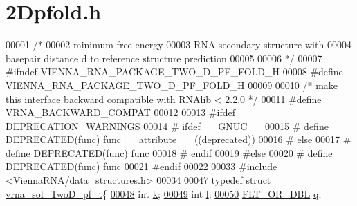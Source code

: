 \hypertarget{2Dpfold_8h_source}{}\section{2\+Dpfold.h}
\label{2Dpfold_8h_source}

\begin{DoxyCode}
00001 \textcolor{comment}{/*}
00002 \textcolor{comment}{      minimum free energy}
00003 \textcolor{comment}{      RNA secondary structure with}
00004 \textcolor{comment}{      basepair distance d to reference structure prediction}
00005 \textcolor{comment}{}
00006 \textcolor{comment}{*/}
00007 \textcolor{preprocessor}{#ifndef VIENNA\_RNA\_PACKAGE\_TWO\_D\_PF\_FOLD\_H}
00008 \textcolor{preprocessor}{#define VIENNA\_RNA\_PACKAGE\_TWO\_D\_PF\_FOLD\_H}
00009 
00010 \textcolor{comment}{/* make this interface backward compatible with RNAlib < 2.2.0 */}
00011 \textcolor{preprocessor}{#define VRNA\_BACKWARD\_COMPAT}
00012 
00013 \textcolor{preprocessor}{#ifdef DEPRECATION\_WARNINGS}
00014 \textcolor{preprocessor}{# ifdef \_\_GNUC\_\_}
00015 \textcolor{preprocessor}{#  define DEPRECATED(func) func \_\_attribute\_\_ ((deprecated))}
00016 \textcolor{preprocessor}{# else}
00017 \textcolor{preprocessor}{#  define DEPRECATED(func) func}
00018 \textcolor{preprocessor}{# endif}
00019 \textcolor{preprocessor}{#else}
00020 \textcolor{preprocessor}{# define DEPRECATED(func) func}
00021 \textcolor{preprocessor}{#endif}
00022 
00033 \textcolor{preprocessor}{#include <\hyperlink{data__structures_8h}{ViennaRNA/data\_structures.h}>}
00034 
\hypertarget{2Dpfold_8h_source.tex_l00047}{}\hyperlink{group__kl__neighborhood__pf}{00047} \textcolor{keyword}{typedef} \textcolor{keyword}{struct }\hyperlink{group__kl__neighborhood__pf_structvrna__sol__TwoD__pf__t}{vrna\_sol\_TwoD\_pf\_t}\{
\hypertarget{2Dpfold_8h_source.tex_l00048}{}\hyperlink{group__kl__neighborhood__pf_ad1f23b46dc4ebd373abdeb0382d87b83}{00048}   \textcolor{keywordtype}{int} \hyperlink{group__kl__neighborhood__pf_ad1f23b46dc4ebd373abdeb0382d87b83}{k};          
\hypertarget{2Dpfold_8h_source.tex_l00049}{}\hyperlink{group__kl__neighborhood__pf_a01133c264eff2c988d144e07803d1b8b}{00049}   \textcolor{keywordtype}{int} \hyperlink{group__kl__neighborhood__pf_a01133c264eff2c988d144e07803d1b8b}{l};          
\hypertarget{2Dpfold_8h_source.tex_l00050}{}\hyperlink{group__kl__neighborhood__pf_a17ebbf425b8769ded74b5c7b85e58ee1}{00050}   \hyperlink{group__data__structures_ga31125aeace516926bf7f251f759b6126}{FLT\_OR\_DBL}  \hyperlink{group__kl__neighborhood__pf_a17ebbf425b8769ded74b5c7b85e58ee1}{q};  

\end{DoxyCode}
